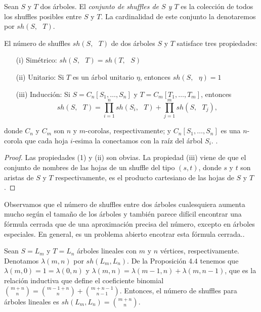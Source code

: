 \documentclass[../main.tex]{subfiles}
\begin{document}
\begin{defi}
    Sean $S$ y $T$ dos \'arboles. El \emph{conjunto de shuffles de $S$ y $T$} es la colecci\'on de todos los shuffles posibles entre $S$ y $T$. La cardinalidad de este conjunto la denotaremos por $sh(S,\text{ }T)$.
\end{defi}
\begin{prop}
    El n\'umero de shuffles $sh(S,\text{ }T)$ de dos \'arboles $S$ y $T$ satisface tres propiedades:
    \begin{enumerate}
        \item[{\rm (i)}] Sim\'etrico: $sh(S, \text{ }T) = sh(T, \text{ }S)$
        \item[{\rm (ii)}] Unitario: Si $T$ es un \'arbol unitario $\eta$, entonces $sh(S, \text{ }\eta)=1$
        \item[{\rm (iii)}] Inducci\'on: Si $S=C_n[S_1,\dots,S_n]$ y $T=C_m[T_1,\dots,T_m]$, entonces
              $$
                  sh(S, \text{ }T)  = \prod_{i=1}^n sh(S_i, \text{ }T) + \prod_{j=1}^m sh(S, \text{ }T_j),
              $$
    \end{enumerate}
    donde $C_n$ y $C_m$ son $n$ y $m$-corolas, respectivamente; y $C_n[S_1,\dots,S_n]$ es una $n$-corola que cada hoja $i$-esima la conectamos con la ra\'iz del \'arbol $S_i$. \cite[Proposici\'on 3.1]{SoT}.
\end{prop}
\begin{proof}
    Las propiedades (1) y (ii) son obvias. La propiedad (iii) viene de que el conjunto de nombres de las hojas de un shuffle del tipo $(s, t)$, donde $s$ y $t$ son aristas de $S$ y $T$ respectivamente, es el producto cartesiano de las hojas de $S$ y $T$.
\end{proof}

Observamos que el n\'umero de shuffles entre dos \'arboles cualesquiera aumenta mucho seg\'un el tama\~no de los \'arboles y tambi\'en parece dif\'icil encontrar una f\'ormula cerrada que de una aproximaci\'on precisa del n\'umero, excepto en \'arboles especiales. En general, es un problema abierto encotrar esta f\'ormula cerrada.\cite[Observaci\'on 3.2]{SoT}.

Sean $S=L_m$ y $T=L_n$ \'arboles lineales con $m$ y $n$ v\'ertices, respectivamente. Denotamos $\lambda(m,n)$ por $sh(L_m, L_n)$. De la Proposici\'on 4.4 tenemos que $\lambda(m,0) = 1 = \lambda(0,n)$ y $\lambda(m,n) = \lambda(m-1,n) + \lambda(m,n-1)$, que es la relaci\'on inductiva que define el coeficiente binomial $\binom{m+n}{n} = \binom{m-1+n}{n} + \binom{m+n-1}{n-1}$. Entonces, el n\'umero de shuffles para \'arboles lineales es $sh(L_m, L_n) = \binom{m+n}{n}$.
\end{document}
